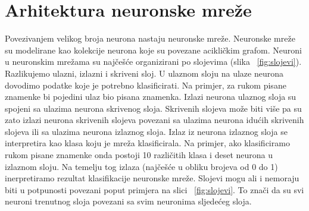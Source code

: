 \documentclass[times, utf8, zavrsni]{fer}
\begin{document}
\section{Arhitektura neuronske mreže}
Povezivanjem velikog broja neurona nastaju neuronske mreže. Neuronske mreže su modelirane kao kolekcije neurona koje su povezane acikličkim grafom. Neuroni u neuronskim mrežama su najčešće organizirani po slojevima (slika ~\ref{fig:slojevi}). Razlikujemo ulazni, izlazni i skriveni sloj. U ulaznom sloju na ulaze neurona dovodimo podatke koje je potrebno klasificirati. Na primjer, za rukom pisane znamenke bi pojedini ulaz bio pisana znamenka. Izlazi neurona ulaznog sloja su spojeni sa ulazima neurona skrivenog sloja. Skrivenih slojeva može biti više pa su zato izlazi neurona skrivenih slojeva povezani sa ulazima neurona idućih skrivenih slojeva ili sa ulazima neurona izlaznog sloja. Izlaz iz neurona izlaznog sloja se interpretira kao klasa koju je mreža klasificirala. Na primjer, ako klasificiramo rukom pisane znamenke onda postoji 10 različitih klasa i deset neurona u izlaznom sloju. Na temelju tog izlaza (najčešće u obliku brojeva od 0 do 1) inerpretiramo rezultat klasifikacije neuronske mreže. Slojevi mogu ali i nemoraju biti u potpunosti povezani poput primjera na slici ~\ref{fig:slojevi}. To znači da su svi neuroni trenutnog sloja povezani sa svim neuronima sljedećeg sloja.
\end{document}

